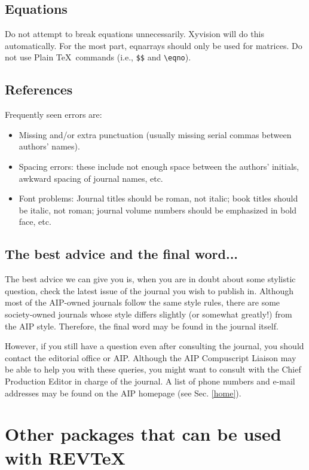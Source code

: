 \subsection{Equations}

Do not attempt to break equations unnecessarily. Xyvision will do this
automatically. For the most part, eqnarrays should only be used for
matrices. Do not use Plain \TeX\ commands (i.e., \verb+$$+ and
\verb+\eqno+).

\subsection{References}

Frequently seen errors are: 
\begin{itemize}
\item Missing and/or extra punctuation (usually missing serial commas
between authors' names).
\item Spacing errors: these include not enough space between the
authors' initials, awkward spacing of journal names, etc.
\item Font problems: Journal titles should be roman, not italic;
book titles should be italic, not roman; journal volume numbers should be
emphasized in bold face, etc.
\end{itemize}

\subsection{The best advice and the final word...}

The best advice we can give you is, when you are in doubt about some
stylistic question, check the latest issue of the journal you wish to
publish in. Although most of the AIP-owned journals follow the same
style rules, there are some society-owned journals whose style differs 
slightly (or somewhat greatly!)
from the AIP style. Therefore, the final word may be found in the
journal itself.

However, if you still have a question even after consulting the journal,
you should contact the editorial office or AIP. Although the AIP Compuscript
Liaison may be able to help you with these queries, you might want to
consult with the Chief Production Editor in charge of the journal. A
list of phone numbers and e-mail addresses may be found on the AIP
homepage (see Sec. \ref{home}).

\bigskip
\bigskip
\section{Other packages that can be used with REV\TeX}

